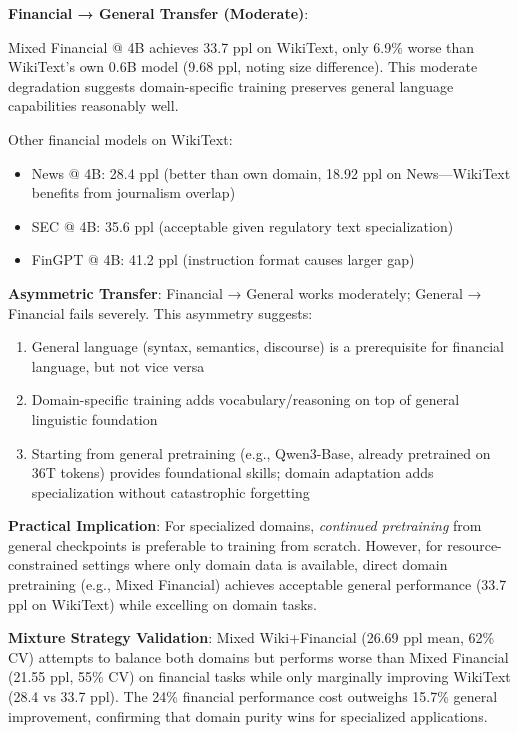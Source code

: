 \textbf{Financial → General Transfer (Moderate)}:

Mixed Financial @ 4B achieves 33.7 ppl on WikiText, only 6.9\% worse than WikiText's own 0.6B model (9.68 ppl, noting size difference). This moderate degradation suggests domain-specific training preserves general language capabilities reasonably well.

Other financial models on WikiText:
\begin{itemize}
\item News @ 4B: 28.4 ppl (better than own domain, 18.92 ppl on News—WikiText benefits from journalism overlap)
\item SEC @ 4B: 35.6 ppl (acceptable given regulatory text specialization)
\item FinGPT @ 4B: 41.2 ppl (instruction format causes larger gap)
\end{itemize}

\textbf{Asymmetric Transfer}: Financial → General works moderately; General → Financial fails severely. This asymmetry suggests:
\begin{enumerate}
\item General language (syntax, semantics, discourse) is a prerequisite for financial language, but not vice versa
\item Domain-specific training adds vocabulary/reasoning on top of general linguistic foundation
\item Starting from general pretraining (e.g., Qwen3-Base, already pretrained on 36T tokens) provides foundational skills; domain adaptation adds specialization without catastrophic forgetting
\end{enumerate}

\textbf{Practical Implication}: For specialized domains, \textit{continued pretraining} from general checkpoints is preferable to training from scratch. However, for resource-constrained settings where only domain data is available, direct domain pretraining (e.g., Mixed Financial) achieves acceptable general performance (33.7 ppl on WikiText) while excelling on domain tasks.

\textbf{Mixture Strategy Validation}: Mixed Wiki+Financial (26.69 ppl mean, 62\% CV) attempts to balance both domains but performs worse than Mixed Financial (21.55 ppl, 55\% CV) on financial tasks while only marginally improving WikiText (28.4 vs 33.7 ppl). The 24\% financial performance cost outweighs 15.7\% general improvement, confirming that domain purity wins for specialized applications.

